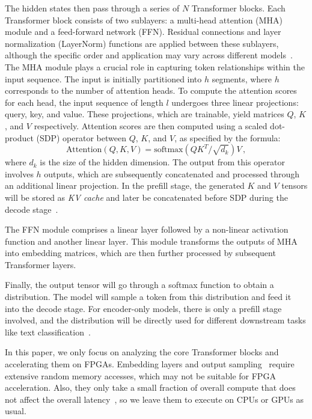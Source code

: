The hidden states then pass through a series of $N$ Transformer blocks.
Each Transformer block consists of two sublayers: a multi-head attention (MHA) module and a feed-forward network (FFN).
Residual connections and layer normalization (LayerNorm) functions are applied between these sublayers, although the specific order and application may vary across different models~\cite{xiong2020preln}.
The MHA module plays a crucial role in capturing token relationships within the input sequence.
The input is initially partitioned into $h$ segments, where $h$ corresponds to the number of attention heads.
To compute the attention scores for each head, the input sequence of length $l$ undergoes three linear projections: query, key, and value.
These projections, which are trainable, yield matrices $Q$, $K$, and $V$ respectively.
Attention scores are then computed using a scaled dot-product (SDP) operator between $Q$, $K$, and $V$, as specified by the formula:
\begin{equation}
\text{Attention}(Q,K,V)=\mathrm{softmax}\left(QK^T\Big/\sqrt{d_k}\right)V\,,
\end{equation}
where $d_k$ is the size of the hidden dimension.
The output from this operator involves $h$ outputs, which are subsequently concatenated and processed through an additional linear projection.
In the prefill stage, the generated $K$ and $V$ tensors will be stored as \emph{KV cache} and later be concatenated before SDP during the decode stage~\cite{pope2022googleinf}.

The FFN module comprises a linear layer followed by a non-linear activation function and another linear layer.
This module transforms the outputs of MHA into embedding matrices, which are then further processed by subsequent Transformer layers.

Finally, the output tensor will go through a softmax function to obtain a distribution.
The model will sample a token from this distribution and feed it into the decode stage.
For encoder-only models, there is only a prefill stage involved, and the distribution will be directly used for different downstream tasks like text classification~\cite{devlin2018bert,liu2019roberta,lan2020albert}.

In this paper, we only focus on analyzing the core Transformer blocks and accelerating them on FPGAs.
Embedding layers and output sampling~\cite{generation_strategies,chen2023speculative} require extensive random memory accesses, which may not be suitable for FPGA acceleration.
Also, they only take a small fraction of overall compute that does not affect the overall latency~\cite{kim2023survey}, so we leave them to execute on CPUs or GPUs as usual.

